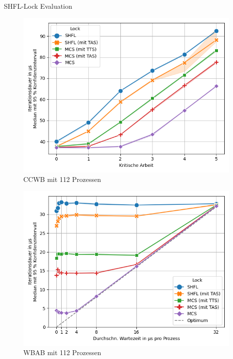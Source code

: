 \documentclass[fleqn,compress,utf8,aspectratio=169,t]{beamer}
\begin{document}
\begin{frame}{SHFL-Lock Evaluation}
    \begin{minipage}{.49\textwidth}
        \begin{figure}
            \includegraphics[width=\textwidth]{../../Dokumentation/Latex/Bilder/benchmarks/intelmpi/shfl/CCWB-processes=112-latency}
            \caption{CCWB mit 112 Prozessen}
        \end{figure}
    \end{minipage}
    \begin{minipage}{.49\textwidth}
        \begin{figure}
            \includegraphics[width=\textwidth]{../../Dokumentation/Latex/Bilder/benchmarks/intelmpi/shfl/WBAB-processes=112,mpi_progress=1-latency}
            \caption{WBAB mit 112 Prozessen}
        \end{figure}
    \end{minipage}
\end{frame}
\end{document}
